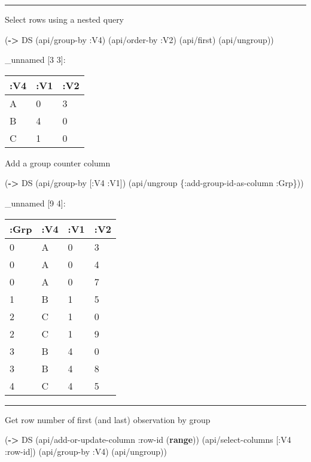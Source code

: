 \documentclass[]{article}
\newenvironment{Shaded}{\begin{snugshade}}{\end{snugshade}}
\newcommand{\KeywordTok}[1]{\textcolor[rgb]{0.13,0.29,0.53}{\textbf{#1}}}
\newcommand{\AttributeTok}[1]{\textcolor[rgb]{0.77,0.63,0.00}{#1}}
\newcommand{\NormalTok}[1]{#1}
\begin{document}
\begin{center}\rule{0.5\linewidth}{0.5pt}\end{center}

Select rows using a nested query

\begin{Shaded}
\begin{Highlighting}[]
\NormalTok{(}\KeywordTok{->}\NormalTok{ DS}
\NormalTok{    (api/group-by }\AttributeTok{:V4}\NormalTok{)}
\NormalTok{    (api/order-by }\AttributeTok{:V2}\NormalTok{)}
\NormalTok{    (api/first)}
\NormalTok{    (api/ungroup))}
\end{Highlighting}
\end{Shaded}

\_unnamed {[}3 3{]}:

\begin{longtable}[]{@{}lll@{}}
\toprule
:V4 & :V1 & :V2\tabularnewline
\midrule
\endhead
A & 0 & 3\tabularnewline
B & 4 & 0\tabularnewline
C & 1 & 0\tabularnewline
\bottomrule
\end{longtable}

Add a group counter column

\begin{Shaded}
\begin{Highlighting}[]
\NormalTok{(}\KeywordTok{->}\NormalTok{ DS}
\NormalTok{    (api/group-by [}\AttributeTok{:V4} \AttributeTok{:V1}\NormalTok{])}
\NormalTok{    (api/ungroup \{}\AttributeTok{:add-group-id-as-column} \AttributeTok{:Grp}\NormalTok{\}))}
\end{Highlighting}
\end{Shaded}

\_unnamed {[}9 4{]}:

\begin{longtable}[]{@{}llll@{}}
\toprule
:Grp & :V4 & :V1 & :V2\tabularnewline
\midrule
\endhead
0 & A & 0 & 3\tabularnewline
0 & A & 0 & 4\tabularnewline
0 & A & 0 & 7\tabularnewline
1 & B & 1 & 5\tabularnewline
2 & C & 1 & 0\tabularnewline
2 & C & 1 & 9\tabularnewline
3 & B & 4 & 0\tabularnewline
3 & B & 4 & 8\tabularnewline
4 & C & 4 & 5\tabularnewline
\bottomrule
\end{longtable}

\begin{center}\rule{0.5\linewidth}{0.5pt}\end{center}

Get row number of first (and last) observation by group

\begin{Shaded}
\begin{Highlighting}[]
\NormalTok{(}\KeywordTok{->}\NormalTok{ DS}
\NormalTok{    (api/add-or-update-column }\AttributeTok{:row-id}\NormalTok{ (}\KeywordTok{range}\NormalTok{))}
\NormalTok{    (api/select-columns [}\AttributeTok{:V4} \AttributeTok{:row-id}\NormalTok{])}
\NormalTok{    (api/group-by }\AttributeTok{:V4}\NormalTok{)}
\NormalTok{    (api/ungroup))}
\end{Highlighting}
\end{Shaded}
\end{document}
